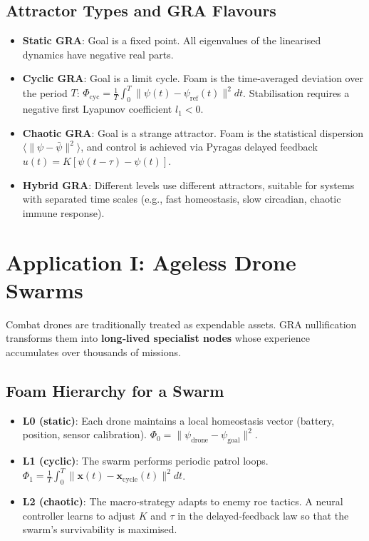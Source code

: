 \documentclass[12pt,a4paper]{article}
\begin{document}
\subsection{Attractor Types and GRA Flavours}
\begin{itemize}
\item \textbf{Static GRA}: Goal is a fixed point. All eigenvalues of the linearised dynamics have negative real parts.
\item \textbf{Cyclic GRA}: Goal is a limit cycle. Foam is the time‑averaged deviation over the period $T$:
$\Phi_{\text{cyc}} = \frac{1}{T}\int_0^T \|\psi(t) - \psi_{\text{ref}}(t)\|^2 dt$.
Stabilisation requires a negative first Lyapunov coefficient $l_1<0$.
\item \textbf{Chaotic GRA}: Goal is a strange attractor. Foam is the statistical dispersion $\langle \| \psi - \bar{\psi} \|^2 \rangle$, 
and control is achieved via Pyragas delayed feedback $u(t)=K[\psi(t-\tau)-\psi(t)]$.
\item \textbf{Hybrid GRA}: Different levels use different attractors, suitable for systems with separated time scales (e.g., fast homeostasis, slow circadian, chaotic immune response).
\end{itemize}

\section{Application I: Ageless Drone Swarms}
\label{sec:swarm}

Combat drones are traditionally treated as expendable assets.
GRA nullification transforms them into \textbf{long‑lived specialist nodes} whose experience accumulates over thousands of missions.

\subsection{Foam Hierarchy for a Swarm}
\begin{itemize}
\item \textbf{L0 (static)}: Each drone maintains a local homeostasis vector (battery, position, sensor calibration).
$\Phi_0 = \|\psi_{\text{drone}} - \psi_{\text{goal}}\|^2$.
\item \textbf{L1 (cyclic)}: The swarm performs periodic patrol loops.
$\Phi_1 = \frac{1}{T}\int_0^T \|\mathbf{x}(t) - \mathbf{x}_{\text{cycle}}(t)\|^2 dt$.
\item \textbf{L2 (chaotic)}: The macro‑strategy adapts to enemy roe tactics.
A neural controller learns to adjust $K$ and $\tau$ in the delayed‑feedback law so that the swarm's survivability is maximised.
\end{itemize}
\end{document}
